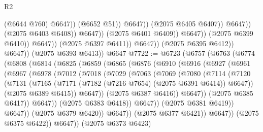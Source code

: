 \begin{lexlean}{R2}
\begin{coremodule}
                                                    (@6644 @760)
                                                    @6647))
                                                (@6652 @51))
                                              @6647))
                                          (@2075 @6405 @6407))
                                        @6647))
                                    (@2075 @6403 @6408))
                                  @6647))
                              (@2075 @6401 @6409))
                            @6647))
                        (@2075 @6399 @6410))
                      @6647))
                  (@2075 @6397 @6411))
                @6647))
            (@2075 @6395 @6412))
          @6647))
      (@2075 @6393 @6413))
    @6647
@7722 := @6723
    (@6757
      (@6763
        (@6774
          (@6808
            (@6814
              (@6825
                (@6859
                  (@6865
                    (@6876
                      (@6910
                        (@6916
                          (@6927
                            (@6961
                              (@6967
                                (@6978
                                  (@7012
                                    (@7018
                                      (@7029
                                        (@7063
                                          (@7069
                                            (@7080
                                              (@7114
                                                (@7120
                                                  (@7131
                                                    (@7165
                                                      (@7171
                                                        (@7182 (@7216 @7654) (@2075 @6391 @6414))
                                                        @6647))
                                                    (@2075 @6389 @6415))
                                                  @6647))
                                              (@2075 @6387 @6416))
                                            @6647))
                                        (@2075 @6385 @6417))
                                      @6647))
                                  (@2075 @6383 @6418))
                                @6647))
                            (@2075 @6381 @6419))
                          @6647))
                      (@2075 @6379 @6420))
                    @6647))
                (@2075 @6377 @6421))
              @6647))
          (@2075 @6375 @6422))
        @6647))
    (@2075 @6373 @6423)

\end{coremodule}
\end{lexlean}
